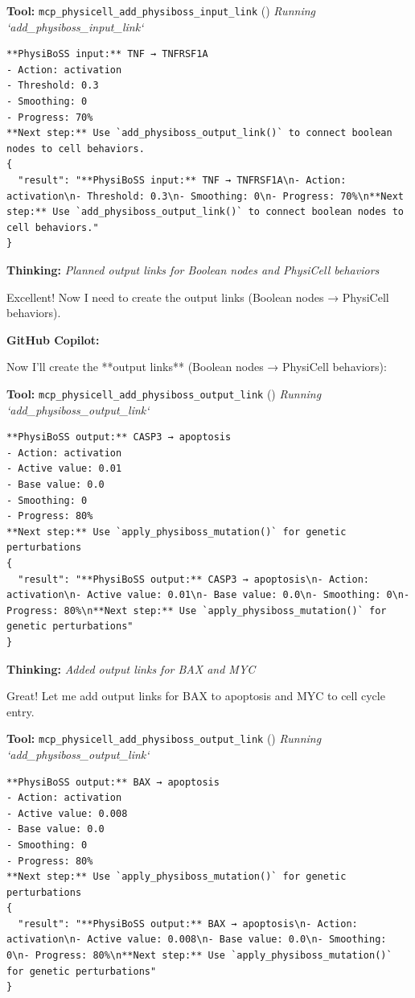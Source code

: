 \documentclass[11pt,a4paper]{article}
\begin{document}
\begin{toolokbox}
\textbf{Tool:} \texttt{mcp\_physicell\_add\_physiboss\_input\_link} (\checkmark)
\textit{Running `add\_physiboss\_input\_link`}
\begin{lstlisting}
**PhysiBoSS input:** TNF → TNFRSF1A
- Action: activation
- Threshold: 0.3
- Smoothing: 0
- Progress: 70%
**Next step:** Use `add_physiboss_output_link()` to connect boolean nodes to cell behaviors.
{
  "result": "**PhysiBoSS input:** TNF → TNFRSF1A\n- Action: activation\n- Threshold: 0.3\n- Smoothing: 0\n- Progress: 70%\n**Next step:** Use `add_physiboss_output_link()` to connect boolean nodes to cell behaviors."
}
\end{lstlisting}
\end{toolokbox}
\begin{thinkbox}
\textbf{Thinking:} \textit{Planned output links for Boolean nodes and PhysiCell behaviors}

Excellent! Now I need to create the output links (Boolean nodes → PhysiCell behaviors).

\end{thinkbox}
\begin{copilotbox}
\textbf{GitHub Copilot:}

Now I'll create the **output links** (Boolean nodes → PhysiCell behaviors):

\end{copilotbox}
\begin{toolokbox}
\textbf{Tool:} \texttt{mcp\_physicell\_add\_physiboss\_output\_link} (\checkmark)
\textit{Running `add\_physiboss\_output\_link`}
\begin{lstlisting}
**PhysiBoSS output:** CASP3 → apoptosis
- Action: activation
- Active value: 0.01
- Base value: 0.0
- Smoothing: 0
- Progress: 80%
**Next step:** Use `apply_physiboss_mutation()` for genetic perturbations
{
  "result": "**PhysiBoSS output:** CASP3 → apoptosis\n- Action: activation\n- Active value: 0.01\n- Base value: 0.0\n- Smoothing: 0\n- Progress: 80%\n**Next step:** Use `apply_physiboss_mutation()` for genetic perturbations"
}
\end{lstlisting}
\end{toolokbox}
\begin{thinkbox}
\textbf{Thinking:} \textit{Added output links for BAX and MYC}

Great! Let me add output links for BAX to apoptosis and MYC to cell cycle entry.

\end{thinkbox}
\begin{toolokbox}
\textbf{Tool:} \texttt{mcp\_physicell\_add\_physiboss\_output\_link} (\checkmark)
\textit{Running `add\_physiboss\_output\_link`}
\begin{lstlisting}
**PhysiBoSS output:** BAX → apoptosis
- Action: activation
- Active value: 0.008
- Base value: 0.0
- Smoothing: 0
- Progress: 80%
**Next step:** Use `apply_physiboss_mutation()` for genetic perturbations
{
  "result": "**PhysiBoSS output:** BAX → apoptosis\n- Action: activation\n- Active value: 0.008\n- Base value: 0.0\n- Smoothing: 0\n- Progress: 80%\n**Next step:** Use `apply_physiboss_mutation()` for genetic perturbations"
}
\end{lstlisting}
\end{toolokbox}
\end{document}
